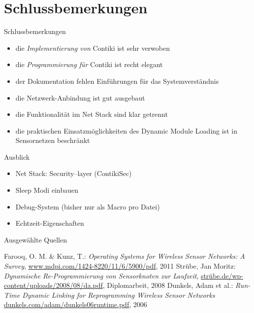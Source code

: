 \section[Fazit]{Schlussbemerkungen}
\begin{frame}{Schlussbemerkungen}
	\begin{itemize}
	\item	die \emph{Implementierung von} Contiki ist sehr verwoben
	\item	die \emph{Programmierung für} Contiki ist recht elegant
	\item	der Dokumentation fehlen Einführungen für das Systemverständnis
	\item 	die Netzwerk-Anbindung ist gut ausgebaut
	\item 	die Funktionalität im Net Stack sind klar getrennt
	\item 	die praktischen Einsatzmöglichkeiten des Dynamic Module Loading
			ist in Sensornetzen beschränkt
\end{itemize}
\end{frame}
\begin{frame}{Ausblick}
	\begin{itemize}
	\item 	Net Stack: Security--layer (ContikiSec)
	\item 	Sleep Modi einbauen
	\item 	Debug-System (bisher nur als Macro pro Datei)
	\item 	Echtzeit-Eigenschaften
	\end{itemize}
\end{frame}
\begin{frame}{Ausgewählte Quellen}
	\begin{thebibliography}{contiki12}
		Farooq, O. M. \& Kunz, T.:
		\emph{Operating Systems for Wireless Sensor Networks: A Survey},
		\url{www.mdpi.com/1424-8220/11/6/5900/pdf},
		2011
		Strübe, Jan Moritz:
		\emph{Dynamische Re-Programmierung von Sensorknoten zur Laufzeit},
		\url{strübe.de/wp-content/uploads/2008/08/da.pdf},
		Diplomarbeit,
		2008
		Dunkels, Adam et al.:
		\emph{Run-Time Dynamic Linking for Reprogramming Wireless Sensor Networks}
		\url{dunkels.com/adam/dunkels06runtime.pdf},
		2006
	\end{thebibliography}
\end{frame}
